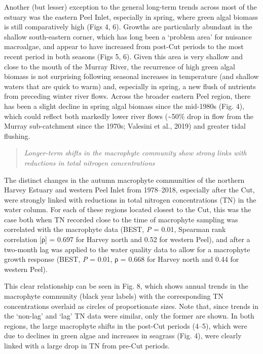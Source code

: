 \documentclass[
]{book}
\begin{document}
Another (but lesser) exception to the general long-term trends across most of the estuary was the eastern Peel Inlet, especially in spring, where green algal biomass is still comparatively high (Figs 4, 6). Growths are particularly abundant in the shallow south-eastern corner, which has long been a `problem area' for nuisance macroalgae, and appear to have increased from post-Cut periods to the most recent period in both seasons (Figs 5, 6). Given this area is very shallow and close to the mouth of the Murray River, the recurrence of high green algal biomass is not surprising following seasonal increases in temperature (and shallow waters that are quick to warm) and, especially in spring, a new flush of nutrients from preceding winter river flows. Across the broader eastern Peel region, there has been a slight decline in spring algal biomass since the mid-1980s (Fig. 4), which could reflect both markedly lower river flows (\textasciitilde50\% drop in flow from the Murray sub-catchment since the 1970s; Valesini et al., 2019) and greater tidal flushing.

\begin{quote}
\emph{Longer-term shifts in the macrophyte community show strong links with reductions in total nitrogen concentrations}
\end{quote}

The distinct changes in the autumn macrophyte communities of the northern Harvey Estuary and western Peel Inlet from 1978--2018, especially after the Cut, were strongly linked with reductions in total nitrogen concentrations (TN) in the water column. For each of these regions located closest to the Cut, this was the case both when TN recorded close to the time of macrophyte sampling was correlated with the macrophyte data (BEST, \emph{P} = 0.01, Spearman rank correlation {[}ρ{]} = 0.697 for Harvey north and 0.52 for western Peel), and after a two-month lag was applied to the water quality data to allow for a macrophyte growth response (BEST, \emph{P} = 0.01, ρ = 0.668 for Harvey north and 0.44 for western Peel).

This clear relationship can be seen in Fig. 8, which shows annual trends in the macrophyte community (black year labels) with the corresponding TN concentrations overlaid as circles of proportionate sizes. Note that, since trends in the `non-lag' and `lag' TN data were similar, only the former are shown. In both regions, the large macrophyte shifts in the post-Cut periods (4--5), which were due to declines in green algae and increases in seagrass (Fig. 4), were clearly linked with a large drop in TN from pre-Cut periods.
\end{document}
